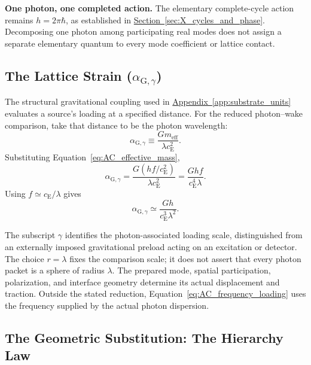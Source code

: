 \noindent\textbf{One photon, one completed action.}
The elementary complete-cycle action remains $h=2\pi\hbar$, as established in \hyperref[sec:X_cycles_and_phase]{Section~\ref*{sec:X_cycles_and_phase}}. Decomposing one photon among participating real modes does not assign a separate elementary quantum to every mode coefficient or lattice contact.

\subsection[The Lattice Strain (alpha G,gamma)]{The Lattice Strain ($\alpha_{\mathrm G,\gamma}$)}

The structural gravitational coupling used in \hyperref[app:substrate_units]{Appendix~\ref*{app:substrate_units}} evaluates a source's loading at a specified distance. For the reduced photon--wake comparison, take that distance to be the photon wavelength:
\begin{equation}
    \alpha_{\mathrm G,\gamma}
    \equiv\frac{Gm_{\mathrm{eff}}}{\lambda c_{\mathrm E}^{2}}.
    \label{eq:AC_photon_loading}
\end{equation}
Substituting Equation~\eqref{eq:AC_effective_mass},
\begin{equation}
    \alpha_{\mathrm G,\gamma}
    =\frac{G\left(hf/c_{\mathrm E}^{2}\right)}
    {\lambda c_{\mathrm E}^{2}}
    =\frac{Ghf}{c_{\mathrm E}^{4}\lambda}.
    \label{eq:AC_frequency_loading}
\end{equation}
Using $f\simeq c_{\mathrm E}/\lambda$ gives
\begin{equation}
    \alpha_{\mathrm G,\gamma}
    \simeq\frac{Gh}{c_{\mathrm E}^{3}\lambda^{2}}.
    \label{eq:AC_wavelength_loading}
\end{equation}

The subscript $\gamma$ identifies the photon-associated loading scale, distinguished from an externally imposed gravitational preload acting on an excitation or detector. The choice $r=\lambda$ fixes the comparison scale; it does not assert that every photon packet is a sphere of radius $\lambda$. The prepared mode, spatial participation, polarization, and interface geometry determine its actual displacement and traction. Outside the stated reduction, Equation~\eqref{eq:AC_frequency_loading} uses the frequency supplied by the actual photon dispersion.

\subsection{The Geometric Substitution: The Hierarchy Law}

